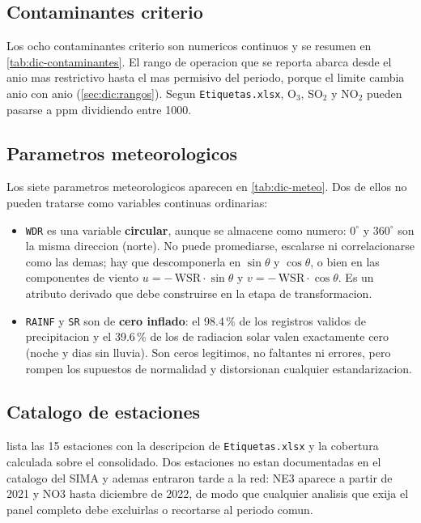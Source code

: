 \subsection{Contaminantes criterio}\label{sec:dic:contaminantes}

Los ocho contaminantes criterio son numericos continuos y se resumen en
\cref{tab:dic-contaminantes}. El rango de operacion que se reporta abarca desde
el anio mas restrictivo hasta el mas permisivo del periodo, porque el limite
cambia anio con anio (\cref{sec:dic:rangos}). Segun \texttt{Etiquetas.xlsx},
O$_3$, SO$_2$ y NO$_2$ pueden pasarse a ppm dividiendo entre 1000.

\subsection{Parametros meteorologicos}\label{sec:dic:meteorologicos}

Los siete parametros meteorologicos aparecen en \cref{tab:dic-meteo}. Dos de
ellos no pueden tratarse como variables continuas ordinarias:

\begin{itemize}
  \item \texttt{WDR} es una variable \textbf{circular}, aunque se almacene como
    numero: $0^{\circ}$ y $360^{\circ}$ son la misma direccion (norte). No
    puede promediarse, escalarse ni correlacionarse como las demas; hay que
    descomponerla en $\sin\theta$ y $\cos\theta$, o bien en las componentes de
    viento $u = -\,\mathrm{WSR}\cdot\sin\theta$ y
    $v = -\,\mathrm{WSR}\cdot\cos\theta$. Es un atributo derivado que debe
    construirse en la etapa de transformacion.
  \item \texttt{RAINF} y \texttt{SR} son de \textbf{cero inflado}: el 98.4\,\%
    de los registros validos de precipitacion y el 39.6\,\% de los de radiacion
    solar valen exactamente cero (noche y dias sin lluvia). Son ceros
    legitimos, no faltantes ni errores, pero rompen los supuestos de normalidad
    y distorsionan cualquier estandarizacion.
\end{itemize}

\subsection{Catalogo de estaciones}\label{sec:dic:estaciones}

 lista las 15 estaciones con la descripcion de
\texttt{Etiquetas.xlsx} y la cobertura calculada sobre el consolidado. Dos
estaciones no estan documentadas en el catalogo del SIMA y ademas entraron
tarde a la red: NE3 aparece a partir de 2021 y NO3 hasta diciembre de 2022, de
modo que cualquier analisis que exija el panel completo debe excluirlas o
recortarse al periodo comun.

